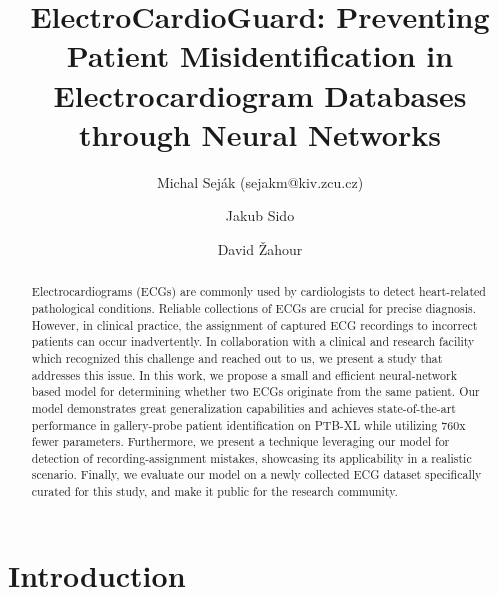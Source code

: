\documentclass[preprint,12pt]{elsarticle}
\begin{document}
\begin{frontmatter}

\title{ElectroCardioGuard: Preventing Patient Misidentification in Electrocardiogram Databases through Neural Networks}


\author[inst1]{Michal Seják (sejakm@kiv.zcu.cz)}
\author[inst1]{Jakub Sido}
\author[inst2]{David Žahour}




\begin{abstract}

\noindent Electrocardiograms (ECGs) are commonly used by cardiologists to detect heart-related pathological conditions. Reliable collections of ECGs are crucial for precise diagnosis. However, in clinical practice, the assignment of captured ECG recordings to incorrect patients can occur inadvertently. In collaboration with a clinical and research facility which recognized this challenge and reached out to us, we present a study that addresses this issue. In this work, we propose a small and efficient neural-network based model for determining whether two ECGs originate from the same patient. Our model demonstrates great generalization capabilities and achieves state-of-the-art performance in gallery-probe patient identification on PTB-XL while utilizing 760x fewer parameters. Furthermore, we present a technique leveraging our model for detection of recording-assignment mistakes, showcasing its applicability in a realistic scenario. Finally, we evaluate our model on a newly collected ECG dataset specifically curated for this study, and make it public for the research community.


\end{abstract}

\end{frontmatter}

\newcommand{\aA}{\textit{vec-avg}}
\newcommand{\aB}{\textit{disc-avg}}
\newcommand{\aC}{\textit{weighted-disc-avg}}
\newcommand{\aD}{\textit{weighted-consistency}}

\section{Introduction}
\end{document}
